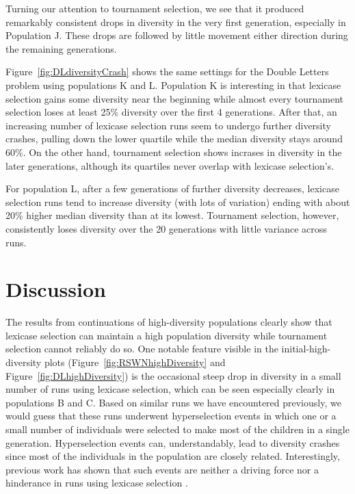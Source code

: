 \documentclass{sig-alternate-05-2015}
\begin{document}
Turning our attention to tournament selection, we see that it produced remarkably consistent drops in diversity in the very first generation, especially in Population J. These drops are followed by little movement either direction during the remaining generations.

Figure~\ref{fig:DLdiversityCrash} shows the same settings for the Double Letters problem using populations K and L. Population K is interesting in that lexicase selection gains some diversity near the beginning while almost every tournament selection loses at least 25\% diversity over the first 4 generations. After that, an increasing number of lexicase selection runs seem to undergo further diversity crashes, pulling down the lower quartile while the median diversity stays around 60\%. On the other hand, tournament selection shows incrases in diversity in the later generations, although its quartiles never overlap with lexicase selection's.

For population L, after a few generations of further diversity decreases, lexicase selection runs tend to increase diversity (with lots of variation) ending with about 20\% higher median diversity than at its lowest. Tournament selection, however, consistently loses diversity over the 20 generations with little variance across runs.

\section{Discussion}


The results from continuations of high-diversity populations clearly show that lexicase selection can maintain a high population diversity while tournament selection cannot reliably do so. One notable feature visible in the initial-high-diversity plots (Figure~\ref{fig:RSWNhighDiversity} and Figure~\ref{fig:DLhighDiversity}) is the occasional steep drop in diversity in a small number of runs using lexicase selection, which can be seen especially clearly in populations B and C. Based on similar runs we have encountered previously, we would guess that these runs underwent hyperselection events in which one or a small number of individuals were selected to make most of the children in a single generation. Hyperselection events can, understandably, lead to diversity crashes since most of the individuals in the population are closely related. Interestingly, previous work has shown that such events are neither a driving force nor a hinderance in runs using lexicase selection \cite{Helmuth:2016:GECCO}.
\end{document}

